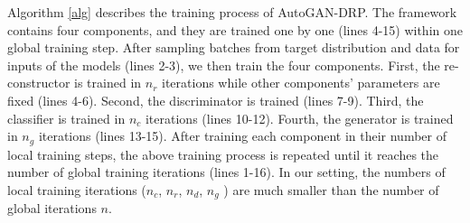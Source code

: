Algorithm \ref{alg} describes the training process of AutoGAN-DRP. The framework contains four components, and they are trained one by one (lines 4-15) within one global training step. After sampling batches from target distribution and data for inputs of the models (lines 2-3), we  then train the four components. First, the re-constructor is trained in $n_r$ iterations while other components' parameters are fixed (lines 4-6). Second, the discriminator is trained (lines 7-9). Third, the classifier is trained in $n_c$ iterations (lines 10-12). Fourth, the generator is trained in $n_g$ iterations (lines 13-15). After training each component in their number of local training steps, the above training process is repeated until it reaches the number of global training iterations (lines 1-16). In our setting, the numbers of local training iterations ($n_c$, $n_r$, $n_d$, $n_g$ ) are much smaller than the number of global iterations $n$.   





